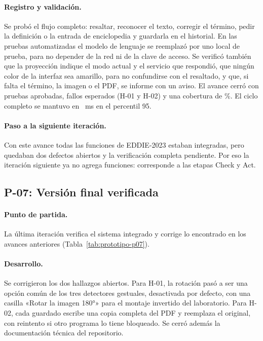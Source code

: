 \paragraph{Registro y validación.} Se probó el flujo completo: resaltar, reconocer el texto, corregir el término, pedir la definición o la entrada de enciclopedia y guardarla en el historial. En las pruebas automatizadas el modelo de lenguaje se reemplazó por uno local de prueba, para no depender de la red ni de la clave de acceso. Se verificó también que la proyección indique el modo actual y el servicio que respondió, que ningún color de la interfaz sea amarillo, para no confundirse con el resaltado, y que, si falta el término, la imagen o el PDF, se informe con un aviso. El avance cerró con \PSeisPruebas{} pruebas aprobadas, \PSeisXfail{} fallos esperados (H-01 y H-02) y una cobertura de \PSeisCobertura\%. El ciclo completo se mantuvo en \PSeisCicloPnoventaycinco~ms en el percentil 95.

\paragraph{Paso a la siguiente iteración.} Con este avance todas las funciones de EDDIE-2023 estaban integradas, pero quedaban dos defectos abiertos y la verificación completa pendiente. Por eso la iteración siguiente ya no agrega funciones: corresponde a las etapas Check y Act.

\subsection{P-07: Versión final verificada}
\label{sec:it_p07}

\paragraph{Punto de partida.} La última iteración verifica el sistema integrado y corrige lo encontrado en los avances anteriores (Tabla~\ref{tab:prototipo-p07}).



\paragraph{Desarrollo.} Se corrigieron los dos hallazgos abiertos. Para H-01, la rotación pasó a ser una opción común de los tres detectores gestuales, desactivada por defecto, con una casilla «Rotar la imagen 180°» para el montaje invertido del laboratorio. Para H-02, cada guardado escribe una copia completa del PDF y reemplaza el original, con reintento si otro programa lo tiene bloqueado. Se cerró además la documentación técnica del repositorio.

